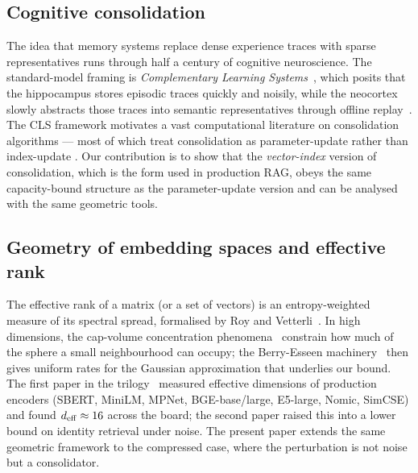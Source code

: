 \subsection{Cognitive consolidation}
\label{sec:related:cls}

The idea that memory systems replace dense experience traces with
sparse representatives runs through half a century of cognitive
neuroscience. The standard-model framing is \emph{Complementary
Learning Systems}~\cite{mcclellandConsolidation1995,
alvarezSquireConsolidation1994, oreillyHippocampus2014, marrSimple1971},
which posits that the hippocampus stores episodic traces quickly and
noisily, while the neocortex slowly abstracts those traces into
semantic representatives through offline replay~\cite{wilson1994reactivation,
robinsReplay1995}. The CLS framework motivates a vast computational
literature on consolidation algorithms --- most of which treat
consolidation as parameter-update rather than index-update
\cite{mccloskey1989cf, kirkpatrickEWC2017, chaudhryGEM2019,
tulvingEpisodic1972}. Our contribution is to show that the
\emph{vector-index} version of consolidation, which is the form used
in production RAG, obeys the same capacity-bound structure as the
parameter-update version and can be analysed with the same geometric
tools.

\subsection{Geometry of embedding spaces and effective rank}
\label{sec:related:geometry}

The effective rank of a matrix (or a set of vectors) is an
entropy-weighted measure of its spectral spread, formalised by Roy
and Vetterli~\cite{royVetterli2007}. In high dimensions, the
cap-volume concentration phenomena~\cite{ball1997elementary,
milman1986asymptotic, ledoux2001concentration, vershynin2018hdp,
beyer1999nn} constrain how much of the sphere a small neighbourhood
can occupy; the Berry-Esseen machinery~\cite{esseen1942} then gives
uniform rates for the Gaussian approximation that underlies our
bound. The first paper in the trilogy~\cite{geometryOfForgetting2026}
measured effective dimensions of production encoders (SBERT,
MiniLM, MPNet, BGE-base/large, E5-large, Nomic, SimCSE) and found
${d_{\mathrm{eff}}} \approx 16$ across the board; the second paper raised this
into a lower bound on identity retrieval under noise. The present
paper extends the same geometric framework to the compressed case,
where the perturbation is not noise but a consolidator.


